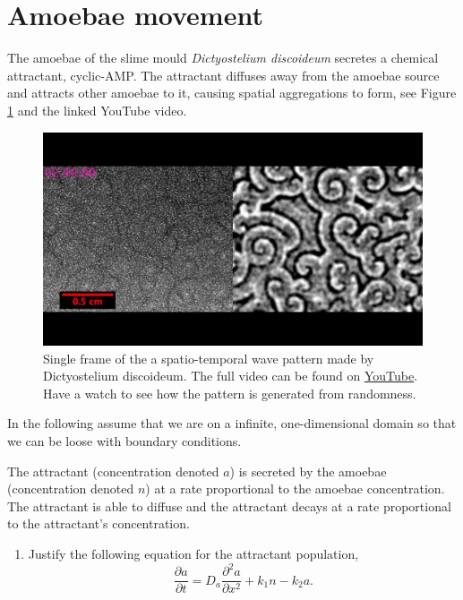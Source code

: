 \documentclass[10pt]{article}
\newcommand{\bb}{\begin{equation}}
\newcommand{\ee}{\end{equation}}
\newcommand{\D}[2]{\frac{\partial #1}{\partial #2}}
\newcommand{\DD}[2]{\frac{\partial^2 #1}{\partial #2^2}}
\newcommand{\fig}[1]{Figure \ref{#1}}
\newcounter{Counter1}
\begin{document}
\section{Amoebae movement}\label{Amoebae movement}
The amoebae of the slime mould \textit{Dictyostelium discoideum} secretes a chemical attractant, cyclic-AMP. The attractant diffuses away from the amoebae source and attracts other amoebae to it, causing spatial aggregations to form, see \fig{Dictyo} and the linked YouTube video.
\begin{figure}[h!!!tb]
\centering
\includegraphics[width=\textwidth,trim={0cm 4cm 0cm 4cm},clip]{../../Pictures/Dictyo_pattern.jpg}
\caption{\label{Dictyo} Single frame of the a spatio-temporal wave pattern made by Dictyostelium discoideum. The full video can be found on \href{https://www.youtube.com/watch?v=oYRF7BaaaJY}{YouTube}. Have a watch to see how the pattern is generated from randomness.}
\end{figure}

In the following assume that we are on a infinite, one-dimensional domain so that we can be loose with boundary conditions.

The attractant (concentration denoted $a$) is secreted by the amoebae (concentration denoted $n$) at a rate proportional to the amoebae concentration. The attractant is able to diffuse and the attractant decays at a rate proportional to the attractant's concentration.
\begin{enumerate}
\item Justify the following equation for the attractant population,
\bb
\D{a}{t}=D_a\DD{a}{x}+k_1n-k_2a.
\ee
\setcounter{Counter1}{\value{enumi}}
\end{enumerate}
\end{document}
